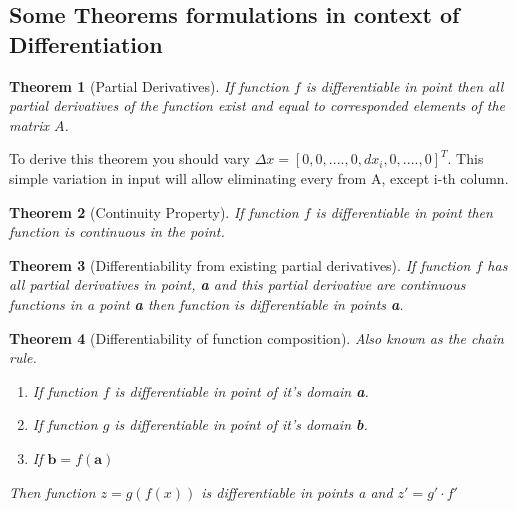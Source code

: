 \documentclass[12pt,a4paper]{article}
\theoremstyle{plain}
\newtheorem{theorem}{Theorem}[section]
\begin{document}
\subsection{Some Theorems formulations in context of Differentiation}
\begin{theorem} [Partial Derivatives]
 If function $f$ is differentiable in point then all partial derivatives of the function exist and equal to corresponded elements of the matrix $A$.
\end{theorem}
To derive this theorem you should vary \textbf{$\varDelta x = [0, 0, ...., 0, dx_i, 0, ...., 0]^T$}.
This simple variation in input will allow eliminating every from A, except i-th column.
\begin{theorem} [Continuity Property]
 If function $f$ is differentiable in point then function is continuous in the point.
\end{theorem}
\begin{theorem} [Differentiability from existing partial derivatives]
 If function $f$ has all partial derivatives in point, \textbf{a} and this partial derivative are continuous functions in a point \textbf{a} then function is differentiable in points \textbf{a}.
\end{theorem}
\begin{theorem} [Differentiability of function composition] Also known as the chain rule.
 \begin{enumerate}
  \item  If function $f$ is differentiable in point of it’s domain \textbf{a}.
  \item  If function $g$ is differentiable in point of it’s domain \textbf{b}.
  \item  If $\textbf{b} = f(\textbf{a})$
 \end{enumerate}
 Then function $z=g(f(x))$ is differentiable in points \textit{a} and 
 $z' = g' \cdot f'$
\end{theorem}
\end{document}

